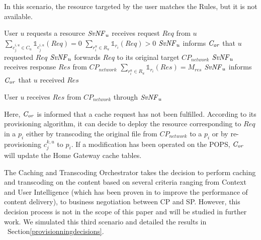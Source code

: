 In this scenario, the resource targeted by the user matches the Rules, but it is not available.

\begin{algorithmic}[1]
\STATE User $u$ requests a resource
\STATE $\mathit{SvNF}_{u}$ receives request $\mathit{Req}$ from $u$
\STATE \( \sum_{c^{i,u}_{j}\in C_{u}}{\mathbb{1}_{c^{i,u}_{j}}(\mathit{Req})} = 0 \)
\STATE \( \sum_{r^{u}_{i}\in R_{u}}{\mathbb{1}_{r_{i}}(\mathit{Req})} > 0  \)
\STATE $\mathit{SvNF}_{u}$ informs $\mathit{C_{or}}$ that $u$ requested $\mathit{Req}$
\ENDIF
\STATE $\mathit{SvNF}_{u}$ forwards $\mathit{Req}$ to its original target \(\mathit{CP}_{\mathit{network}}\)
\STATE $\mathit{SvNF}_{u}$ receives response $\mathit{Res}$ from \(\mathit{CP}_{\mathit{network}}\)
	\STATE \( \sum_{r^{u}_{i}\in R_{u}}{\mathbb{1}_{r_{i}}(\mathit{Res})}=M_{res}\) 
	\STATE $\mathit{SvNF}_{u}$ informs $\mathit{C_{or}}$ that $u$ received $\mathit{Res}$
	\ENDIF
\ENDIF

 
\STATE User $u$ receives $\mathit{Res}$ from \(\mathit{CP}_{\mathit{network}}\) through $\mathit{SvNF}_{u}$
\end{algorithmic}

Here, $\mathit{C_{or}}$ is informed that a cache request has not been fulfilled. According to its provisioning algorithm, it can decide to deploy the resource corresponding to $\mathit{Req}$ in a $p_{i}$ either by transcoding the original file from \(\mathit{CP}_{\mathit{network}}\) to a $p_{i}$ or by re-provisioning $c^{k,u}_{j}$ to $p_{i}$.
If a modification has been operated on the POPS, $\mathit{C_{or}}$ will update the Home Gateway cache tables.

The Caching and Transcoding Orchestrator takes the decision to perform caching and transcoding on the content based on several criteria ranging from Context and User Intelligence (which has been proven in \cite{wang_cpcdn:_2015} to improve the performance of content delivery), to business negotiation between CP and SP.
However, this decision process is not in the scope of this paper and will be studied in further work. 
We simulated this third scenario and detailed the results in ~Section\ref{provisionningdecisions}.


